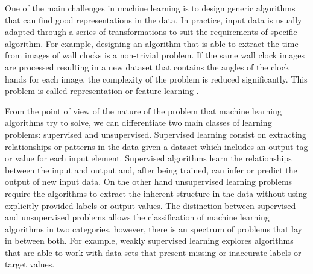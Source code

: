 \medskip

One of the main challenges in machine learning is to design generic algorithms that can find good representations in the data. In practice, input data is usually adapted through a series of transformations to suit the requirements of specific algorithm. For example, designing an algorithm that is able to extract the time from images of wall clocks is a non-trivial problem. If the same wall clock images are processed resulting in a new dataset that contains the angles of the clock hands for each image, the complexity of the problem is reduced significantly. This problem is called representation or feature learning \citep{bengio2013representation}.

\bigskip
\bigskip


\bigskip
\bigskip

From the point of view of the nature of the problem that machine learning algorithms try to solve, we can differentiate two main classes of learning problems: supervised and unsupervised. Supervised learning consist on extracting relationships or patterns in the data given a dataset which includes an output tag or value for each input element. Supervised algorithms learn the relationships between the input and output and, after being trained, can infer or predict the output of new input data. On the other hand unsupervised learning problems require the algorithms to extract the inherent structure in the data without using explicitly-provided labels or output values. The distinction between supervised and unsupervised problems allows the classification of machine learning algorithms in two categories, however, there is an spectrum of problems that lay in between both. For example, weakly supervised learning \citep{hernandez2016weak} explores algorithms that are able to work with data sets that present missing or inaccurate labels or target values. 

